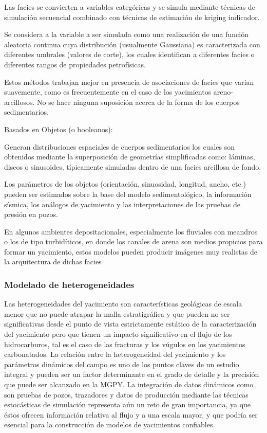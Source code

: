 Las facies se convierten a variables categ\'oricas y se simula mediante t\'ecnicas de simulaci\'on secuencial combinado con t\'ecnicas de estimaci\'on de kriging indicador.

Se considera a la variable a ser simulada como una realizaci\'on de una funci\'on aleatoria continua cuya distribuci\'on (usualmente Gaussiana) es caracterizada con diferentes umbrales (valores de corte), los cuales identifican a diferentes facies o diferentes rangos de propiedades petrof\'isicas.

Estos m\'etodos trabajan mejor en presencia de asociaciones de facies que var\'ian suavemente, como es frecuentemente en el caso de los yacimientos areno-arcillosos. 
No se hace ninguna suposici\'on acerca de la forma de los cuerpos sedimentarios.

Basados en Objetos (o booleanos):

Generan distribuciones espaciales de cuerpos sedimentarios los cuales son obtenidos mediante la superposici\'on de geometr\'ias simplificadas como: l\'aminas, discos o sinusoides, t\'ipicamente simuladas dentro de una facies arcillosa de fondo.

Los par\'ametros de los objetos (orientaci\'on, sinuosidad, longitud, ancho, etc.) pueden ser estimados sobre la base del modelo sedimentol\'ogico, la informaci\'on s\'ismica, los an\'alogos de yacimiento y las interpretaciones de las pruebas de presi\'on en pozos.

En algunos ambientes depositacionales, especialmente los fluviales con meandros o los de tipo turbid\'iticos, en donde los canales de arena son medios propicios para formar un yacimiento, estos modelos pueden producir im\'agenes muy realistas de la arquitectura de dichas facies

\subsubsection{Modelado de heterogeneidades}

Las heterogeneidades del yacimiento son caracter\'isticas geol\'ogicas de escala menor que no puede atrapar la malla estratigr\'afica y que pueden no ser significativas desde el punto de vista estrictamente est\'atico de la caracterizaci\'on del yacimiento pero que tienen un impacto significativo en el flujo de los hidrocarburos, tal es el caso de las fracturas y los v\'ugulos en los yacimientos carbonatados. La relaci\'on entre la heterogeneidad del yacimiento y los par\'ametros din\'amicos del campo es uno de los puntos claves de un estudio integral y pueden ser un factor determinante en el grado de detalle y la precisi\'on que puede ser alcanzado en la MGPY.
La integraci\'on de datos din\'amicos como son pruebas de pozos, trazadores y datos de producci\'on mediante las t\'ecnicas estoc\'asticas de simulaci\'on representa a\'un un reto de gran importancia, ya que \'estos ofrecen informaci\'on relativa al flujo y a una escala mayor, y que podr\'ia ser esencial para la construcci\'on de modelos de yacimientos confiables.

